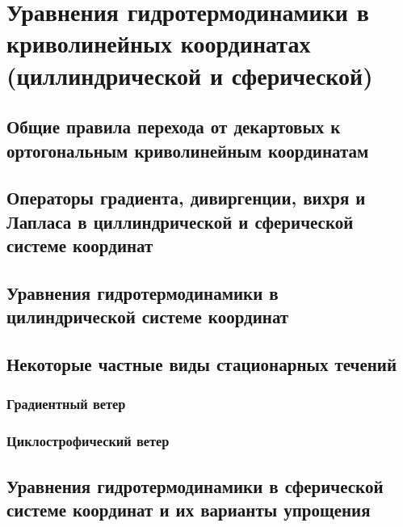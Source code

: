 \chapter{Уравнения гидротермодинамики в криволинейных координатах (циллиндрической и сферической)}

\section{Общие правила перехода от декартовых к ортогональным криволинейным координатам}

\section{Операторы градиента, дивиргенции, вихря и Лапласа в циллиндрической и сферической системе координат}

\section{Уравнения гидротермодинамики в цилиндрической системе координат}

\section{Некоторые частные виды стационарных течений}

\subsection{Градиентный ветер}

\subsection{Циклострофический ветер}

\section{Уравнения гидротермодинамики в сферической системе координат и их варианты упрощения}


